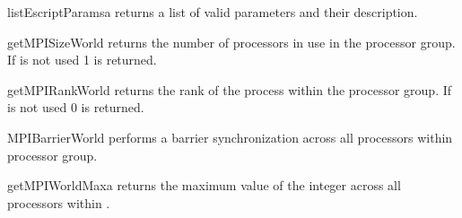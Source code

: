 \begin{funcdesc}{listEscriptParams}{a}
returns a list of valid parameters and their description.
\end{funcdesc}

\begin{funcdesc}{getMPISizeWorld}{}
returns the number of \MPI processors in use in the  processor group.
If \MPI is not used 1 is returned.
\end{funcdesc}
\begin{funcdesc}{getMPIRankWorld}{}
returns the rank of the process within the  processor group.
If \MPI is not used 0 is returned.
\end{funcdesc}
\begin{funcdesc}{MPIBarrierWorld}{}
performs a barrier synchronization across all processors within 
processor group.
\end{funcdesc}
\begin{funcdesc}{getMPIWorldMax}{a}
returns the maximum value of the integer  across all 
processors within .
\end{funcdesc}

